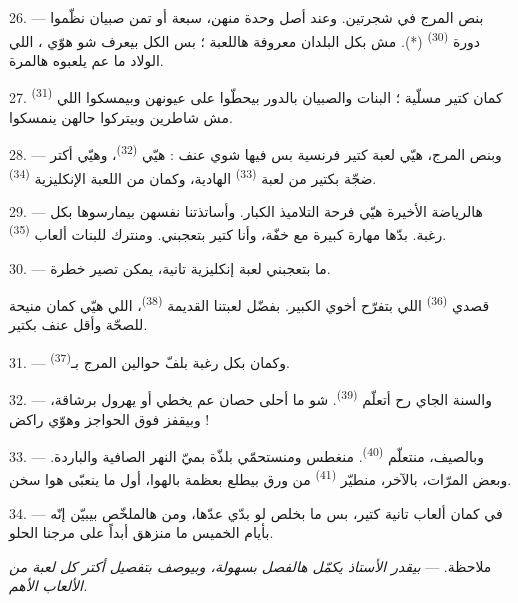 26. --- بنص المرج في شجرتين. وعند أصل وحدة منهن، سبعة أو تمن صبيان
نظّموا دورة \textsuperscript{(30)} (*). مش بكل
البلدان معروفة هاللعبة ؛ بس الكل بيعرف شو هوّي ، اللي الولاد ما عم يلعبوه هالمرة.

\VUsaut{5.0mm}
\VUsaut{3.4mm}

27. \textsuperscript{(31)} كمان كتير مسلّية ؛ البنات
والصبيان بالدور بيحطّوا  على عيونهن وبيمسكوا
اللي مش شاطرين وبيتركوا حالهن ينمسكوا.

28. --- وبنص المرج، هيّي لعبة كتير فرنسية بس فيها شوي عنف : هيّي
\textsuperscript{(32)}، وهيّي أكتر ضجّة بكتير من
لعبة \textsuperscript{(33)} الهادية، وكمان من اللعبة
الإنكليزية \textsuperscript{(34)}.

29. --- هالرياضة الأخيرة هيّي فرحة التلاميذ الكبار. وأساتذتنا نفسهن
بيمارسوها بكل رغبة. بدّها مهارة كبيرة مع خفّة، وأنا كتير بتعجبني.
ومنترك للبنات ألعاب \textsuperscript{(35)}.

30. --- ما بتعجبني لعبة إنكليزية تانية، يمكن تصير خطرة.

قصدي \textsuperscript{(36)} اللي بتفرّح أخوي الكبير.
بفضّل لعبتنا القديمة \textsuperscript{(38)}، اللي هيّي
كمان منيحة للصحّة وأقل عنف بكتير.

\VUsaut{4.6mm}
\VUsaut{3.0mm}

31. --- وكمان بكل رغبة بلفّ حوالين المرج بـ\textsuperscript{(37)}.

32. --- والسنة الجاي رح أتعلّم \textsuperscript{(39)}.
شو ما أحلى حصان عم يخطي أو يهرول برشاقة، وبيقفز فوق الحواجز وهوّي راكض !

33. --- وبالصيف، منتعلّم \textsuperscript{(40)}. منغطس
ومنستحمّي بلذّة بميّ النهر الصافية والباردة. وبعض المرّات، بالآخر،
منطيّر \textsuperscript{(41)} من ورق بيطلع بعظمة بالهوا،
أول ما ينعبّى هوا سخن.

34. --- في كمان ألعاب تانية كتير، بس ما بخلص لو بدّي عدّها، ومن هالملخّص
بيبيّن إنّه بأيام الخميس ما منزهق أبداً على مرجنا الحلو.

ملاحظة. --- \textit{بيقدر الأستاذ يكمّل هالفصل بسهولة، وبيوصف بتفصيل
أكتر كل لعبة من الألعاب الأهم.}
